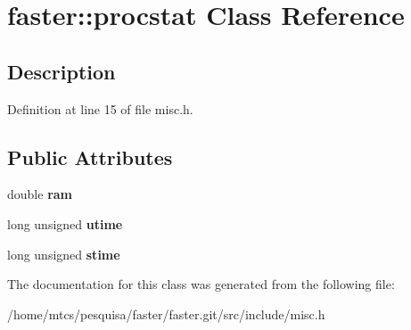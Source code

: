\hypertarget{classfaster_1_1procstat}{}\section{faster\+:\+:procstat Class Reference}
\label{classfaster_1_1procstat}


\subsection{Description}


Definition at line 15 of file misc.\+h.

\subsection*{Public Attributes}
\begin{DoxyCompactItemize}
\item 
\hypertarget{classfaster_1_1procstat_ad12d45d3f1d819e7613411835af89432}{}\label{classfaster_1_1procstat_ad12d45d3f1d819e7613411835af89432} 
double {\bfseries ram}
\item 
\hypertarget{classfaster_1_1procstat_a3033ca3dd5cf4fcca5d4f647149d21f7}{}\label{classfaster_1_1procstat_a3033ca3dd5cf4fcca5d4f647149d21f7} 
long unsigned {\bfseries utime}
\item 
\hypertarget{classfaster_1_1procstat_a8972e2ce24bf1961693edbd76344d1fd}{}\label{classfaster_1_1procstat_a8972e2ce24bf1961693edbd76344d1fd} 
long unsigned {\bfseries stime}
\end{DoxyCompactItemize}


The documentation for this class was generated from the following file\+:\begin{DoxyCompactItemize}
\item 
/home/mtcs/pesquisa/faster/faster.\+git/src/include/misc.\+h\end{DoxyCompactItemize}
